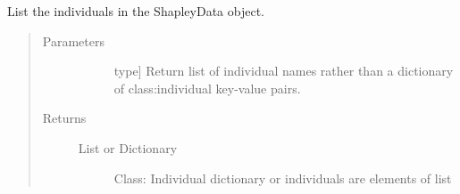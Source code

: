 \documentclass[letterpaper,10pt,english]{sphinxmanual}
\begin{document}
\begin{fulllineitems}
\begin{fulllineitems}
\begin{quote}
\begin{description}
\end{description}\end{quote}

\end{fulllineitems}


\begin{fulllineitems}
\label{\detokenize{index:methylnet.interpretation_classes.ShapleyDataExplorer.list_individuals}}
List the individuals in the ShapleyData object.
\begin{quote}\begin{description}
\item[{Parameters}] \leavevmode\begin{description}
\item[{}] \leavevmode{[}type{]}
Return list of individual names rather than a dictionary of class:individual key-value pairs.

\end{description}

\item[{Returns}] \leavevmode\begin{description}
\item[{List or Dictionary}] \leavevmode
Class: Individual dictionary or individuals are elements of list

\end{description}

\end{description}\end{quote}

\end{fulllineitems}



\end{fulllineitems}
\end{document}
